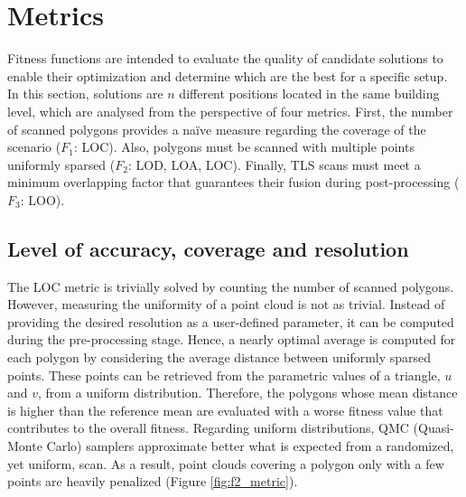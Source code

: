 \section{Metrics}

Fitness functions are intended to evaluate the quality of candidate solutions to enable their optimization and determine which are the best for a specific setup. In this section, solutions are $n$ different positions located in the same building level, which are analysed from the perspective of four metrics. First, the number of scanned polygons provides a naïve measure regarding the coverage of the scenario ($F_1$: LOC). Also, polygons must be scanned with multiple points uniformly sparsed ($F_2$: LOD, LOA, LOC). Finally, TLS scans must meet a minimum overlapping factor that guarantees their fusion during post-processing ($F_3$: LOO). 

\subsection{Level of accuracy, coverage and resolution}

The LOC metric is trivially solved by counting the number of scanned polygons. However, measuring the uniformity of a point cloud is not as trivial. Instead of providing the desired resolution as a user-defined parameter, it can be computed during the pre-processing stage. Hence, a nearly optimal average is computed for each polygon by considering the average distance between uniformly sparsed points. These points can be retrieved from the parametric values of a triangle, $u$ and $v$, from a uniform distribution. Therefore, the polygons whose mean distance is higher than the reference mean are evaluated with a worse fitness value that contributes to the overall fitness. Regarding uniform distributions, QMC (Quasi-Monte Carlo) samplers approximate better what is expected from a randomized, yet uniform, scan. As a result, point clouds covering a polygon only with a few points are heavily penalized (Figure \ref{fig:f2_metric}). 

